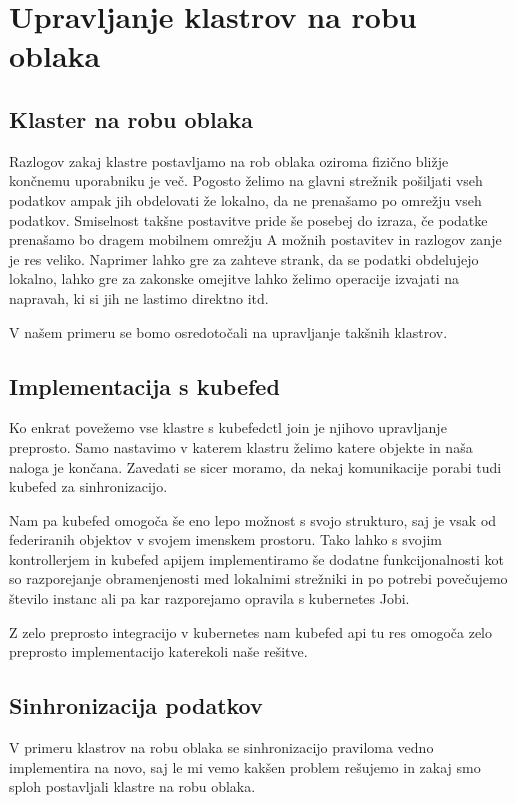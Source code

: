 \documentclass[a4paper, 12pt]{book}
\begin{document}
\chapter{Upravljanje klastrov na robu oblaka}
\section{Klaster na robu oblaka}
Razlogov zakaj klastre postavljamo na rob oblaka oziroma fizično bližje končnemu uporabniku je več.
Pogosto želimo na glavni strežnik pošiljati vseh podatkov ampak jih obdelovati že lokalno, da ne prenašamo po omrežju vseh podatkov.
Smiselnost takšne postavitve pride še posebej do izraza, če podatke prenašamo bo dragem mobilnem omrežju
A možnih postavitev in razlogov zanje je res veliko.
Naprimer lahko gre za zahteve strank, da se podatki obdelujejo lokalno, lahko gre za zakonske omejitve lahko želimo operacije izvajati na napravah, ki si jih ne lastimo direktno itd.

V našem primeru se bomo osredotočali na upravljanje takšnih klastrov.

\section{Implementacija s kubefed}
Ko enkrat povežemo vse klastre s kubefedctl join je njihovo upravljanje preprosto.
Samo nastavimo v katerem klastru želimo katere objekte in naša naloga je končana.
Zavedati se sicer moramo, da nekaj komunikacije porabi tudi kubefed za sinhronizacijo.

Nam pa kubefed omogoča še eno lepo možnost s svojo strukturo, saj je vsak od federiranih objektov v svojem imenskem prostoru.
Tako lahko s svojim kontrollerjem in kubefed apijem implementiramo še dodatne funkcijonalnosti kot so razporejanje obramenjenosti med lokalnimi strežniki in po potrebi povečujemo število instanc ali pa kar razporejamo opravila s kubernetes Jobi.

Z zelo preprosto integracijo v kubernetes nam kubefed api tu res omogoča zelo preprosto implementacijo katerekoli naše rešitve.
\section{Sinhronizacija podatkov}
V primeru klastrov na robu oblaka se sinhronizacijo praviloma vedno implementira na novo, saj le mi vemo kakšen problem rešujemo in zakaj smo sploh postavljali klastre na robu oblaka.
\end{document}
